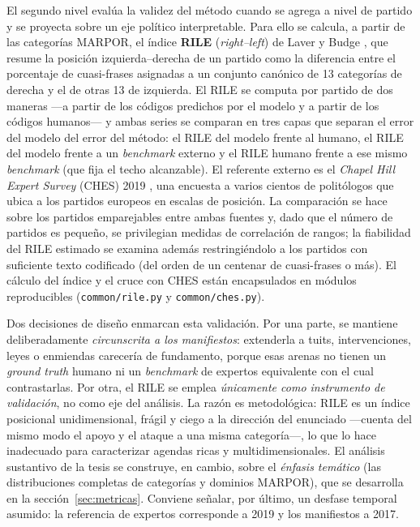 El segundo nivel evalúa la validez del método cuando se agrega a nivel de
partido y se proyecta sobre un eje político interpretable. Para ello se calcula,
a partir de las categorías MARPOR, el índice \textbf{RILE}
(\emph{right--left}) de Laver y Budge \cite{laver1992party}, que resume la
posición izquierda--derecha de un partido como la diferencia entre el porcentaje
de cuasi-frases asignadas a un conjunto canónico de 13 categorías de derecha y el
de otras 13 de izquierda. El RILE se computa por partido de dos maneras ---a
partir de los códigos predichos por el modelo y a partir de los códigos
humanos--- y ambas series se comparan en tres capas que separan el error del
modelo del error del método: el RILE del modelo frente al humano, el RILE del
modelo frente a un \emph{benchmark} externo y el RILE humano frente a ese mismo
\emph{benchmark} (que fija el techo alcanzable). El referente externo es el
\emph{Chapel Hill Expert Survey} (CHES) 2019 \cite{jolly2022ches, ches2019data},
una encuesta a varios cientos de politólogos que ubica a los partidos europeos en
escalas de posición. La
comparación se hace sobre los partidos emparejables entre ambas fuentes y, dado
que el número de partidos es pequeño, se privilegian medidas de correlación de
rangos; la fiabilidad del RILE estimado se examina además restringiéndolo a los
partidos con suficiente texto codificado (del orden de un centenar de cuasi-frases
o más). El cálculo del índice y el cruce con CHES están encapsulados en módulos
reproducibles (\texttt{common/rile.py} y \texttt{common/ches.py}).

Dos decisiones de diseño enmarcan esta validación. Por una parte, se mantiene
deliberadamente \emph{circunscrita a los manifiestos}: extenderla a tuits,
intervenciones, leyes o enmiendas carecería de fundamento, porque esas arenas no
tienen un \emph{ground truth} humano ni un \emph{benchmark} de expertos
equivalente con el cual contrastarlas. Por otra, el RILE se emplea
\emph{únicamente como instrumento de validación}, no como eje del análisis. La
razón es metodológica: RILE es un índice posicional unidimensional, frágil y
ciego a la dirección del enunciado ---cuenta del mismo modo el apoyo y el ataque
a una misma categoría---, lo que lo hace inadecuado para caracterizar agendas
ricas y multidimensionales. El análisis sustantivo de la tesis se construye, en
cambio, sobre el \emph{énfasis temático} (las distribuciones completas de
categorías y dominios MARPOR), que se desarrolla en la
sección~\ref{sec:metricas}. Conviene señalar, por último, un desfase temporal
asumido: la referencia de expertos corresponde a 2019 y los manifiestos a 2017.

